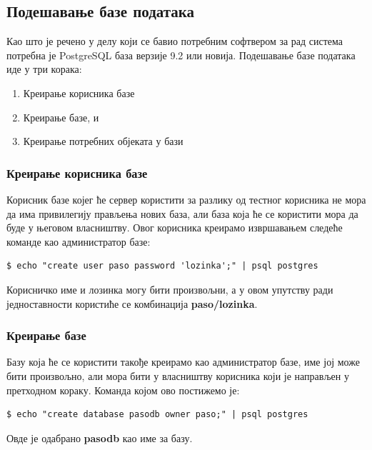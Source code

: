 \documentclass[a4paper, 12pt, diplomski]{etfcyr}
\begin{document}
				\subsection{Подешавање базе података}
					\begin{justify}
						Као што је речено у делу који се бавио потребним софтвером за рад система потребна је PostgreSQL база верзије 9.2 или новија. Подешавање базе података иде у три корака:
						\begin{enumerate}[noitemsep]
							\item Креирање корисника базе
							\item Креирање базе, и
							\item Креирање потребних објеката у бази
						\end{enumerate}
					\end{justify}

					\subsubsection*{Креирање корисника базе}
						\begin{justify}
							Корисник базе којег ће сервер користити за разлику од тестног корисника не мора да има привилегију прављења нових база, али база која ће се користити мора да буде у његовом власништву. Овог корисника креирамо извршавањем следеће команде као администратор базе:
							\begin{footnotesize}
								\begin{verbatim}
$ echo "create user paso password 'lozinka';" | psql postgres
								\end{verbatim}
							\end{footnotesize}
							Корисничко име и лозинка могу бити произвољни, а у овом упутству ради једноставности користиће се комбинација \textbf{paso/lozinka}.
						\end{justify}

					\subsubsection*{Креирање базе}
						\begin{justify}
							Базу која ће се користити такође креирамо као администратор базе, име јој може бити произвољно, али мора бити у власништву корисника који је направљен у претходном кораку. Команда којом ово постижемо је:
							\begin{footnotesize}
								\begin{verbatim}
$ echo "create database pasodb owner paso;" | psql postgres
								\end{verbatim}
							\end{footnotesize}
							Овде је одабрано \textbf{pasodb} као име за базу.
						\end{justify}
\end{document}
